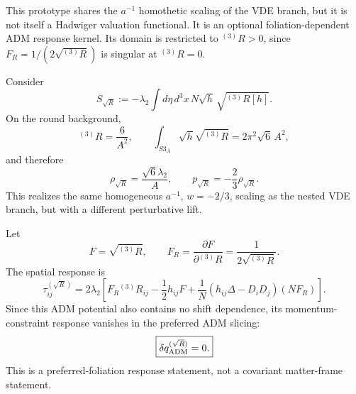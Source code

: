 \documentclass[11pt,a4paper]{article}
\def\Sthree{S3}%
\def\dd{d}%
\numberwithin{equation}{section}
\theoremstyle{definition}
\theoremstyle{plain}
\theoremstyle{remark}
\newcommand{\Sthree}{S^3}
\newcommand{\dd}{\mathrm{d}}
\begin{document}
This prototype shares the \(a^{-1}\) homothetic scaling of the VDE branch, but it is not itself a Hadwiger valuation functional.  It is an optional foliation-dependent ADM response kernel.  Its domain is restricted to \({}^{(3)}R>0\), since \(F_R=1/(2\sqrt{{}^{(3)}R})\) is singular at \({}^{(3)}R=0\).

Consider
\begin{equation}
S_{\sqrt R}:=-\lambda_2\int \dd\eta\,\dd^3x\,N\sqrt h\,\sqrt{{}^{(3)}R[h]}.
\end{equation}
On the round background,
\begin{equation}
{}^{(3)}R=\frac{6}{A^2},
\qquad
\int_{\Sthree_A}\sqrt h\sqrt{{}^{(3)}R}=2\pi^2\sqrt6\,A^2,
\end{equation}
and therefore
\begin{equation}
\rho_{\sqrt R}=\frac{\sqrt6\lambda_2}{A},
\qquad
p_{\sqrt R}=-\frac23\rho_{\sqrt R}.
\end{equation}
This realizes the same homogeneous \(a^{-1}\), \(w=-2/3\), scaling as the nested VDE branch, but with a different perturbative lift.

Let
\begin{equation}
F=\sqrt{{}^{(3)}R},
\qquad
F_R=\frac{\partial F}{\partial {}^{(3)}R}=\frac1{2\sqrt{{}^{(3)}R}}.
\end{equation}
The spatial response is
\begin{equation}
\boxed{
\tau_{ij}^{(\sqrt R)}
=
2\lambda_2
\left[
F_R{}^{(3)}R_{ij}
-\frac12h_{ij}F
+\frac1N
\left(h_{ij}\Delta-D_iD_j\right)(NF_R)
\right].
}
\end{equation}
Since this ADM potential also contains no shift dependence, its momentum-constraint response vanishes in the preferred ADM slicing:
\begin{equation}
\boxed{\delta q^{(\sqrt R)}_{\rm ADM}=0.}
\end{equation}
This is a preferred-foliation response statement, not a covariant matter-frame statement.
\end{document}
